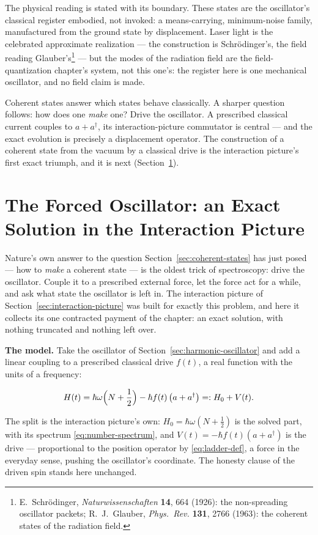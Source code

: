 The physical reading is stated with its boundary. These states are the oscillator's classical register embodied, not invoked: a means-carrying, minimum-noise family, manufactured from the ground state by displacement. Laser light is the celebrated approximate realization --- the construction is Schr\"odinger's, the field reading Glauber's\footnote{E.~Schr\"odinger, \emph{Naturwissenschaften} \textbf{14}, 664 (1926): the non-spreading oscillator packets; R.~J.~Glauber, \emph{Phys.~Rev.} \textbf{131}, 2766 (1963): the coherent states of the radiation field.} --- but the modes of the radiation field are the field-quantization chapter's system, not this one's: the register here is one mechanical oscillator, and no field claim is made.

Coherent states answer which states behave classically. A sharper question follows: how does one \emph{make} one? Drive the oscillator. A prescribed classical current couples to $a + a^\dagger$, its interaction-picture commutator is central --- and the exact evolution is precisely a displacement operator. The construction of a coherent state from the vacuum by a classical drive is the interaction picture's first exact triumph, and it is next (Section~\ref{sec:forced-oscillator}).

\section{The Forced Oscillator: an Exact Solution in the Interaction Picture}
\label{sec:forced-oscillator}

Nature's own answer to the question Section~\ref{sec:coherent-states} has just posed --- how to \emph{make} a coherent state --- is the oldest trick of spectroscopy: drive the oscillator. Couple it to a prescribed external force, let the force act for a while, and ask what state the oscillator is left in. The interaction picture of Section~\ref{sec:interaction-picture} was built for exactly this problem, and here it collects its one contracted payment of the chapter: an exact solution, with nothing truncated and nothing left over.

\medskip\noindent\textbf{The model.} Take the oscillator of Section~\ref{sec:harmonic-oscillator} and add a linear coupling to a prescribed classical drive $f(t)$, a real function with the units of a frequency:
\begin{linenomath}
    \begin{equation*}
        H(t) = \hbar\omega\Bigl(N + \frac12\Bigr) - \hbar f(t)\,\bigl(a + a^\dagger\bigr) =: H_0 + V(t) .
    \end{equation*}
\end{linenomath}
The split is the interaction picture's own: $H_0 = \hbar\omega(N + \tfrac12)$ is the solved part, with its spectrum \eqref{eq:number-spectrum}, and $V(t) = -\hbar f(t)(a + a^\dagger)$ is the drive --- proportional to the position operator by \eqref{eq:ladder-def}, a force in the everyday sense, pushing the oscillator's coordinate. The honesty clause of the driven spin stands here unchanged.

